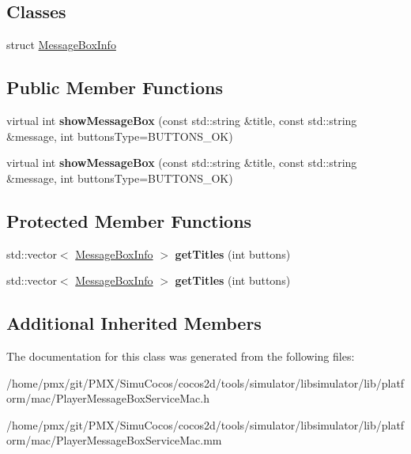 \subsection*{Classes}
\begin{DoxyCompactItemize}
\item 
struct \hyperlink{structPlayerMessageBoxServiceMac_1_1MessageBoxInfo}{Message\+Box\+Info}
\end{DoxyCompactItemize}
\subsection*{Public Member Functions}
\begin{DoxyCompactItemize}
\item 
\mbox{\label{classPlayerMessageBoxServiceMac_a92bb772c092795cf855d41e147db5dfd}} 
virtual int {\bfseries show\+Message\+Box} (const std\+::string \&title, const std\+::string \&message, int buttons\+Type=B\+U\+T\+T\+O\+N\+S\+\_\+\+OK)
\item 
\mbox{\label{classPlayerMessageBoxServiceMac_a4abed1bd8f769ec0f359148459e9d6a5}} 
virtual int {\bfseries show\+Message\+Box} (const std\+::string \&title, const std\+::string \&message, int buttons\+Type=B\+U\+T\+T\+O\+N\+S\+\_\+\+OK)
\end{DoxyCompactItemize}
\subsection*{Protected Member Functions}
\begin{DoxyCompactItemize}
\item 
\mbox{\label{classPlayerMessageBoxServiceMac_a1ba3b53c249582bad67b63033de4fa5e}} 
std\+::vector$<$ \hyperlink{structPlayerMessageBoxServiceMac_1_1MessageBoxInfo}{Message\+Box\+Info} $>$ {\bfseries get\+Titles} (int buttons)
\item 
\mbox{\label{classPlayerMessageBoxServiceMac_ac4d0cf45355482f7c1842b9710ccff5d}} 
std\+::vector$<$ \hyperlink{structPlayerMessageBoxServiceMac_1_1MessageBoxInfo}{Message\+Box\+Info} $>$ {\bfseries get\+Titles} (int buttons)
\end{DoxyCompactItemize}
\subsection*{Additional Inherited Members}


The documentation for this class was generated from the following files\+:\begin{DoxyCompactItemize}
\item 
/home/pmx/git/\+P\+M\+X/\+Simu\+Cocos/cocos2d/tools/simulator/libsimulator/lib/platform/mac/Player\+Message\+Box\+Service\+Mac.\+h\item 
/home/pmx/git/\+P\+M\+X/\+Simu\+Cocos/cocos2d/tools/simulator/libsimulator/lib/platform/mac/Player\+Message\+Box\+Service\+Mac.\+mm\end{DoxyCompactItemize}
